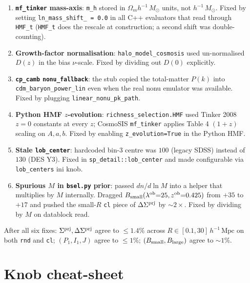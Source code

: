 \documentclass[a4paper, 11pt]{article}
\newcommand{\lob}{\lambda^{\rm ob}}
\newcommand{\zob}{z^{\rm ob}}
\newcommand{\hMpc}{h^{-1}\,\mathrm{Mpc}}
\newcommand{\hMsun}{h^{-1}\,M_{\odot}}
\newcommand{\Sprj}{\Sigma^{\rm prj}}
\newcommand{\DSprj}{\Delta\Sigma^{\rm prj}}
\newcommand{\Bsmall}{B_{\rm small}}
\newcommand{\Blarge}{B_{\rm large}}
\newcommand{\modname}[1]{\textcolor{kwcol}{\texttt{#1}}}
\newcommand{\blk}[1]{\textcolor{datablockcol}{\texttt{#1}}}
\begin{document}
\begin{enumerate}
  \setlength\itemsep{2pt}
  \item \textbf{\modname{mf\_tinker} mass-axis}: \blk{m\_h} stored in
    $\Omega_m \hMsun$ units, not $\hMsun$.  Fixed by setting
    \texttt{ln\_mass\_shift\_ = 0.0} in all C++ evaluators that
    read through \texttt{HMF\_t} (\texttt{HMF\_t} does the rescale
    at construction; a second shift was double-counting).
  \item \textbf{Growth-factor normalisation}: \modname{halo\_model\_cosmosis}
    used un-normalised $D(z)$ in the bias $\nu$-scale.  Fixed by
    dividing out $D(0)$ explicitly.
  \item \textbf{\modname{cp\_camb} \texttt{nonu\_fallback}}: the stub
    copied the total-matter $P(k)$ into \blk{cdm\_baryon\_power\_lin}
    even when the real nonu emulator was available.  Fixed by
    plugging \texttt{linear\_nonu\_pk\_path}.
  \item \textbf{Python HMF $z$-evolution}:
    \texttt{richness\_selection.HMF} used Tinker 2008 $z{=}0$
    constants at every $z$; CosmoSIS \modname{mf\_tinker} applies Table 4
    $(1+z)$ scaling on $A, a, b$.  Fixed by enabling
    \texttt{z\_evolution=True} in the Python HMF.
  \item \textbf{Stale \modname{lob\_center}}: hardcoded bin-3 centre
    was $100$ (legacy SDSS) instead of $130$ (DES Y3).  Fixed in
    \texttt{sp\_detail::lob\_center} and made configurable via
    \texttt{lob\_centers} ini knob.
  \item \textbf{Spurious $M$ in \modname{bsel.py} prior}: passed
    $dn/d\ln M$ into a helper that multiplies by $M$ internally.
    Dragged $\Bsmall(\lob{=}25, \zob{=}0.425)$ from $+35$ to $+17$
    and pushed the small-$R$ \texttt{cl} piece of $\DSprj$ by
    $\sim 2\times$.  Fixed by dividing by $M$ on datablock read.
\end{enumerate}

After all six fixes: $\Sprj, \DSprj$ agree to $\leq 1.4\%$ across
$R \in [0.1, 30]\,\hMpc$ on both \texttt{rnd} and \texttt{cl};
$(P_1, I_1, J)$ agree to $\leq 1\%$; $(\Bsmall, \Blarge)$ agree to
$\sim 1\%$.

\section{Knob cheat-sheet}
\label{sec:knobs}
\end{document}
